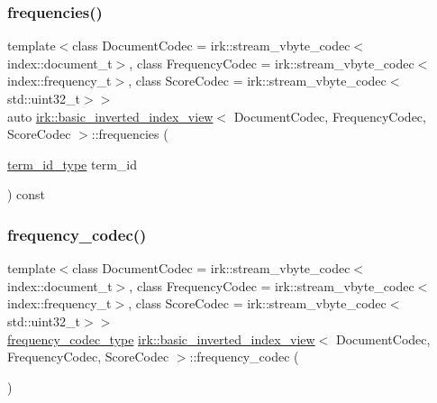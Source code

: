 \mbox{\label{classirk_1_1basic__inverted__index__view_abd006dfc6b00dff46a2f46576efb71cd}} 
\subsubsection{\texorpdfstring{frequencies()}{frequencies()}}
{\footnotesize\ttfamily template$<$class Document\+Codec  = irk\+::stream\+\_\+vbyte\+\_\+codec$<$index\+::document\+\_\+t$>$, class Frequency\+Codec  = irk\+::stream\+\_\+vbyte\+\_\+codec$<$index\+::frequency\+\_\+t$>$, class Score\+Codec  = irk\+::stream\+\_\+vbyte\+\_\+codec$<$std\+::uint32\+\_\+t$>$$>$ \\
auto \mbox{\hyperlink{classirk_1_1basic__inverted__index__view}{irk\+::basic\+\_\+inverted\+\_\+index\+\_\+view}}$<$ Document\+Codec, Frequency\+Codec, Score\+Codec $>$\+::frequencies (\begin{DoxyParamCaption}\item[{\mbox{\hyperlink{classirk_1_1basic__inverted__index__view_a6b272abc76df208ce59bac93810e7331}{term\+\_\+id\+\_\+type}}}]{term\+\_\+id }\end{DoxyParamCaption}) const\hspace{0.3cm}{\ttfamily [inline]}}

\mbox{\label{classirk_1_1basic__inverted__index__view_a7338edd10ee7eab058b840fa3e382faa}} 
\subsubsection{\texorpdfstring{frequency\+\_\+codec()}{frequency\_codec()}}
{\footnotesize\ttfamily template$<$class Document\+Codec  = irk\+::stream\+\_\+vbyte\+\_\+codec$<$index\+::document\+\_\+t$>$, class Frequency\+Codec  = irk\+::stream\+\_\+vbyte\+\_\+codec$<$index\+::frequency\+\_\+t$>$, class Score\+Codec  = irk\+::stream\+\_\+vbyte\+\_\+codec$<$std\+::uint32\+\_\+t$>$$>$ \\
\mbox{\hyperlink{classirk_1_1basic__inverted__index__view_a3d985daf7381825ddf7788611d03cb8f}{frequency\+\_\+codec\+\_\+type}} \mbox{\hyperlink{classirk_1_1basic__inverted__index__view}{irk\+::basic\+\_\+inverted\+\_\+index\+\_\+view}}$<$ Document\+Codec, Frequency\+Codec, Score\+Codec $>$\+::frequency\+\_\+codec (\begin{DoxyParamCaption}{ }\end{DoxyParamCaption})\hspace{0.3cm}{\ttfamily [inline]}}

